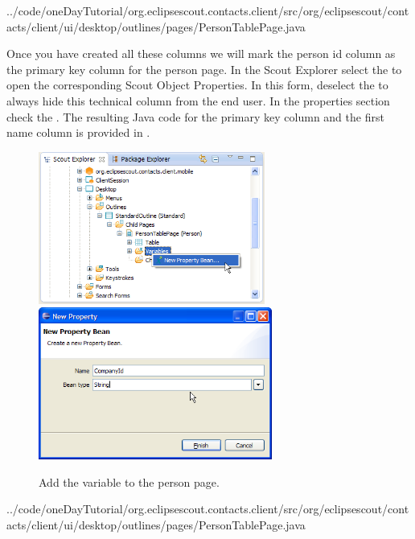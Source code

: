 \documentclass[a4paper,10pt,twoside]{book}
\begin{document}

{../code/oneDayTutorial/org.eclipsescout.contacts.client/src/org/eclipsescout/contacts/client/ui/desktop/outlines/pages/PersonTablePage.java}

Once you have created all these columns we will mark the person id column as the primary key column for the person page. 
In the Scout Explorer select the  to open the corresponding Scout Object Properties. 
In this form, deselect the  to always hide this technical column from the end user. 
In the properties  section check the . 
The resulting Java code for the primary key column and the first name column is provided in . 

\begin{figure}
\includegraphics[height=5cm]{new_bean_companyid_contextmenu.png} \hspace{5mm}
\includegraphics[height=5cm]{new_bean_companyid.png}
\caption{Add the  variable to the person page.}
\end{figure}


{../code/oneDayTutorial/org.eclipsescout.contacts.client/src/org/eclipsescout/contacts/client/ui/desktop/outlines/pages/PersonTablePage.java}
\end{document}
